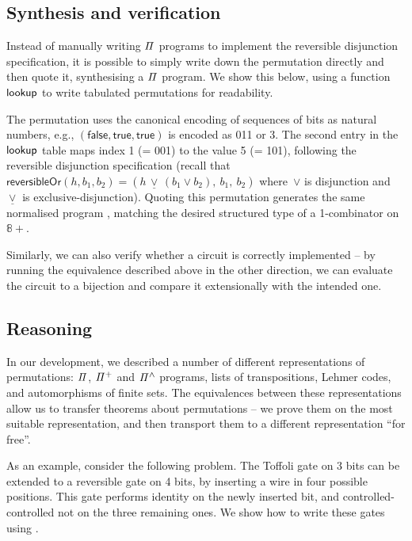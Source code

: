 \subsection{Synthesis and verification}

Instead of manually writing $\mathit{\Pi}$ programs to implement the reversible disjunction specification, it is possible to
simply write down the permutation directly and then quote it, synthesising a $\mathit{\Pi}$ program. We show this below,
using a function $\operatorname{\mathsf{lookup}}$ to write tabulated permutations for readability.

\medskip
\resetperm{}

\noindent
The permutation uses the canonical encoding of sequences of bits as natural numbers, e.g.,
${(\mathsf{false},\mathsf{true},\mathsf{true})}$ is encoded as 011 or 3. The second entry in the $\operatorname{\mathsf{lookup}}$ table
maps index 1 (= 001) to the value 5 (= 101), following the reversible disjunction specification (recall that
$\mathsf{reversibleOr}(h,b_1,b_2) = (h \,\underline{\vee}\, (b_1 \vee b_2), ~b_1, ~b_2)$ where~$\vee$ is disjunction
and~$\underline{\vee}$ is exclusive-disjunction). Quoting this permutation generates the same normalised program
, matching the desired structured type of a 1-combinator on $\mathbb{8}+$.

Similarly, we can also verify whether a circuit is correctly implemented -- by running the equivalence described above
in the other direction, we can evaluate the circuit to a bijection and compare it extensionally with the intended one.

\subsection{Reasoning}

In our development, we described a number of different representations of permutations: $\mathit{\Pi}$, $\mathit{{\Pi}^{+}}$ and
$\mathit{{\Pi}^{\wedge}}$ programs, lists of transpositions, Lehmer codes, and automorphisms of finite sets. The equivalences between
these representations allow us to transfer theorems about permutations -- we prove them on the most suitable
representation, and then transport them to a different representation ``for free''.

As an example, consider the following problem. The Toffoli gate on 3 bits can be extended to a reversible gate on 4
bits, by inserting a wire in four possible positions. This gate performs identity on the newly inserted bit, and
controlled-controlled not on the three remaining ones. We show how to write these gates using .
\medskip
\extendedToffoli{}

